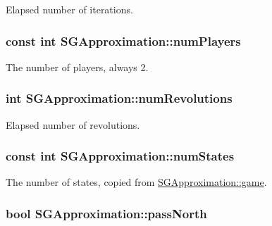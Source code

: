 Elapsed number of iterations. \hypertarget{class_s_g_approximation_aad4f5b13c4d578cc7a2c9d2290de2524}{
\subsubsection[{num\+Players}]{\setlength{\rightskip}{0pt plus 5cm}const int S\+G\+Approximation\+::num\+Players\hspace{0.3cm}{\ttfamily [private]}}}\label{class_s_g_approximation_aad4f5b13c4d578cc7a2c9d2290de2524}
The number of players, always 2. \hypertarget{class_s_g_approximation_a9772bd4fa2add763f1177f87149c5d07}{
\subsubsection[{num\+Revolutions}]{\setlength{\rightskip}{0pt plus 5cm}int S\+G\+Approximation\+::num\+Revolutions\hspace{0.3cm}{\ttfamily [private]}}}\label{class_s_g_approximation_a9772bd4fa2add763f1177f87149c5d07}
Elapsed number of revolutions. \hypertarget{class_s_g_approximation_a5de424fc814b5770fedc453052d61d3b}{
\subsubsection[{num\+States}]{\setlength{\rightskip}{0pt plus 5cm}const int S\+G\+Approximation\+::num\+States\hspace{0.3cm}{\ttfamily [private]}}}\label{class_s_g_approximation_a5de424fc814b5770fedc453052d61d3b}
The number of states, copied from \hyperlink{class_s_g_approximation_a3244a3d7de5f2b909d438f5b4ab337ee}{S\+G\+Approximation\+::game}. \hypertarget{class_s_g_approximation_a054de05172362fe53f74488e9ab5a026}{
\subsubsection[{pass\+North}]{\setlength{\rightskip}{0pt plus 5cm}bool S\+G\+Approximation\+::pass\+North\hspace{0.3cm}{\ttfamily [private]}}}\label{class_s_g_approximation_a054de05172362fe53f74488e9ab5a026}
